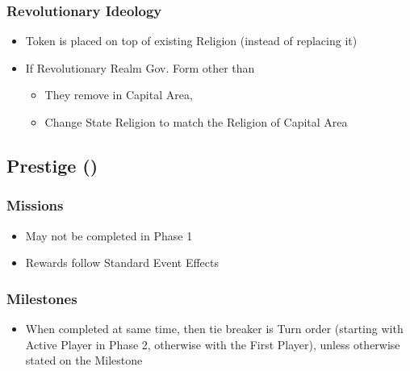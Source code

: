 \documentclass[10pt]{article}
\begin{document}
\subsubsection*{Revolutionary Ideology}
\begin{itemize}
	\item Token is placed on top of existing Religion (instead of replacing it)
	\item If Revolutionary Realm  Gov. Form other than 
	\begin{itemize}
		\item They remove \revolution in Capital Area, 
		\item Change State Religion to match the Religion of Capital Area
	\end{itemize}
\end{itemize}

\subsection*{Prestige (\prestige) }

\subsubsection*{Missions}
\begin{itemize}
	\item May not be completed in Phase 1
	\item Rewards follow Standard Event Effects
\end{itemize}

\subsubsection*{Milestones}
\begin{itemize}
	\item When completed at same time, then tie breaker is Turn order (starting with Active Player in Phase 2, otherwise with the First Player), unless otherwise stated on the Milestone
\end{itemize}
\end{document}
